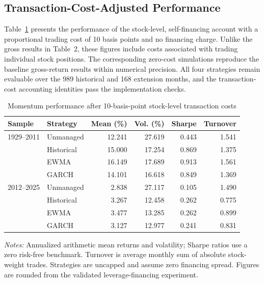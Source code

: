 \documentclass[11pt]{article}
\begin{document}
\subsection{Transaction-Cost-Adjusted Performance}
\label{sec:transaction_cost_results}
Table~\ref{tab:transaction_costs} presents the performance of the stock-level, self-financing account with a proportional trading cost of 10 basis points and no financing charge. Unlike the gross results in Table~2, these figures include costs associated with trading individual stock positions. The corresponding zero-cost simulations reproduce the baseline gross-return results within numerical precision. All four strategies remain evaluable over the 989 historical and 168 extension months, and the transaction-cost accounting identities pass the implementation checks.

\begin{table}[htbp]
\centering
\caption{Momentum performance after 10-basis-point stock-level transaction costs}
\label{tab:transaction_costs}
\small
\begin{tabular}{llrrrr}
\hline
Sample & Strategy & Mean (\%) & Vol. (\%) & Sharpe & Turnover \\
\hline
1929--2011 & Unmanaged & 12.241 & 27.619 & 0.443 & 1.541 \\
 & Historical & 15.000 & 17.254 & 0.869 & 1.375 \\
 & EWMA & 16.149 & 17.689 & 0.913 & 1.561 \\
 & GARCH & 14.101 & 16.618 & 0.849 & 1.369 \\
\hline
2012--2025 & Unmanaged & 2.838 & 27.117 & 0.105 & 1.490 \\
 & Historical & 3.267 & 12.458 & 0.262 & 0.775 \\
 & EWMA & 3.477 & 13.285 & 0.262 & 0.899 \\
 & GARCH & 3.127 & 12.977 & 0.241 & 0.831 \\
\hline
\end{tabular}
\begin{minipage}{0.94\linewidth}\footnotesize\emph{Notes:} Annualized arithmetic mean returns and volatility; Sharpe ratios use a zero risk-free benchmark. Turnover is average monthly sum of absolute stock-weight trades. Strategies are uncapped and assume zero financing spread. Figures are rounded from the validated leverage-financing experiment.\end{minipage}
\end{table}
\end{document}
